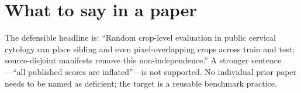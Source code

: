 \section{What to say in a paper}

The defensible headline is: ``Random crop-level evaluation in public cervical cytology can place sibling and even pixel-overlapping crops across train and test; source-disjoint manifests remove this non-independence.'' A stronger sentence---``all published scores are inflated''---is not supported. No individual prior paper needs to be named as deficient; the target is a reusable benchmark practice.
